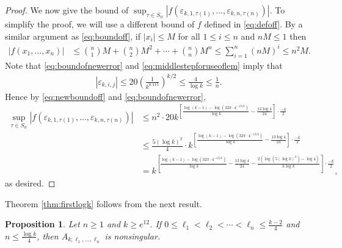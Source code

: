 \documentclass[11pt,letterpaper,reqno]{amsart}
\numberwithin{figure}{section}
\numberwithin{table}{section}
\theoremstyle{definition}
\theoremstyle{plain}
\newtheorem{proposition}[theorem]{Proposition}
\theoremstyle{definition}
\theoremstyle{definition}
\theoremstyle{remark}
\numberwithin{equation}{section}
\theoremstyle{remark}
\begin{document}
\begin{proof}
We now give the bound of  $\sup_{\tau\in S_n}|f(\varepsilon_{k,1,\tau(1)},...,\varepsilon_{k,n,\tau(n)})|$. To simplify the proof, we will use a different bound of $f$ defined in \eqref{eq:defoff}. By a similar argument as \eqref{eq:boundoff}, if $|x_i|\leq M$ for all $1\leq i\leq n$ and $nM\leq1$ then
\begin{align}
    |f(x_1,...,x_n)|&\leq\binom{n}{1}M+\binom{n}{2}M^2+\cdots+\binom{n}{n}M^n\leq \sum_{i=1}^n (nM)^i\leq n^2M.\label{eq:newboundoff}
\end{align}
Note that \eqref{eq:boundofnewerror} and \eqref{eq:middlestepforuseoflem} imply that 
\begin{align}
   |\varepsilon_{k,i,j}|\leq20\left(\frac{1}{k^{0.115}}\right)^{k/2}\leq \frac{4}{\log k}\leq \frac{1}{n}.
\end{align}
Hence by \eqref{eq:newboundoff} and \eqref{eq:boundofnewerror}, 
 \begin{align}
        \sup_{\tau\in S_n}|f(\varepsilon_{k,1,\tau(1)},...,\varepsilon_{k,n,\tau(n)})|&\leq n^2\cdot20k^{\left[\frac{\log(k-1)-\log(32\pi\cdot4^{-13/6})}{\log k}-\frac{13\log4}{24}\right]\cdot\frac{-k}{2}}\\&\leq\frac{5(\log k)^2}{4}\cdot k^{\left[\frac{\log(k-1)-\log(32\pi\cdot4^{-13/6})}{\log k}-\frac{13\log4}{24}\right]\cdot\frac{-k}{2}}\\&=k^{\left[\frac{\log(k-1)-\log(32\pi\cdot4^{-13/6})}{\log k}-\frac{13\log4}{24}-\frac{2(\log(5(\log k)^2)-\log4)}{k\log k}\right]\cdot\frac{-k}{2}},
    \end{align}
    as desired.
\end{proof}  
Theorem \ref{thm:firstlogk} follows from the next result.
\begin{proposition}\label{prop:nonsingularfarfromcenter}
Let $n\geq1$ and $k\geq e^{12}$. If $0\leq\ell_1<\ell_2<\cdots<\ell_n\leq\frac{k-2}{4}$ and $n\leq\frac{\log k}{4}$, then $A_{k;\ell_1,...,\ell_n}$ is nonsingular.
  \end{proposition}
\end{document}
